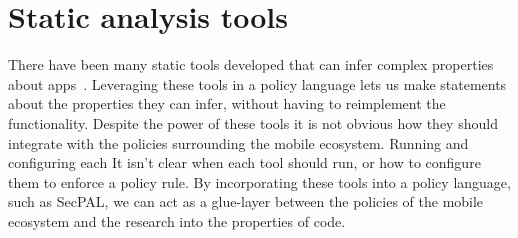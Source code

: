 \documentclass[thesis.tex]{subfiles}
\begin{document}
\section{Static analysis tools}

There have been many static tools developed that can infer complex
properties about
apps~\cite{felt_android_2011,song_integrated_2016,antonin_carette_investigating_2017,schmidt_static_2009,enck_taintdroid:_2014}.
Leveraging these tools in a policy language lets us make statements about the
properties they can infer, without having to reimplement the functionality.
Despite the power of these tools it is not obvious how they should integrate
with the policies surrounding the mobile ecosystem. Running and configuring each
It isn't clear when each tool should run, or how to configure them to enforce a
policy rule. By incorporating these tools into a policy language, such as
SecPAL, we can act as a glue-layer between the policies of the mobile ecosystem
and the research into the properties of code.
\end{document}
